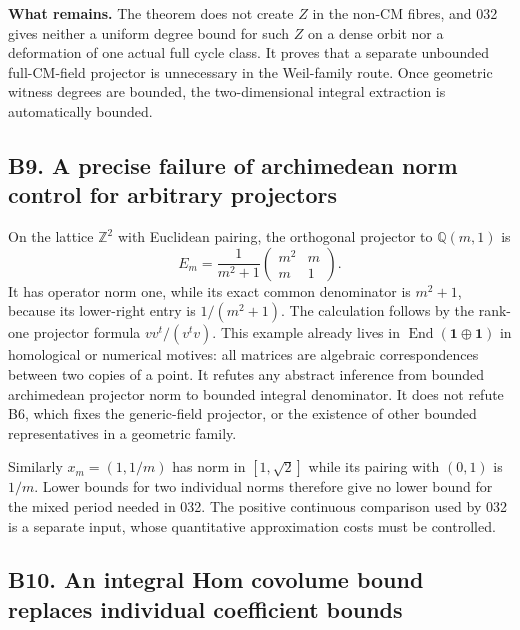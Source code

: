 \documentclass[11pt,a4paper]{article}
\theoremstyle{definition}
\begin{document}
\textbf{What remains.} The theorem does not create \(Z\) in the non-CM fibres, and 032 gives neither a uniform degree bound for such \(Z\) on a dense orbit nor a deformation of one actual full cycle class. It proves that a separate unbounded full-CM-field projector is unnecessary in the Weil-family route. Once geometric witness degrees are bounded, the two-dimensional integral extraction is automatically bounded.

\subsection{B9. A precise failure of archimedean norm control for arbitrary projectors}\label{b9.-a-precise-failure-of-archimedean-norm-control-for-arbitrary-projectors}

On the lattice \(\mathbb Z^2\) with Euclidean pairing, the orthogonal projector to \(\mathbb Q(m,1)\) is \[
 E_m=\frac1{m^2+1}\begin{pmatrix}m^2&m\\m&1\end{pmatrix}.
\] It has operator norm one, while its exact common denominator is \(m^2+1\), because its lower-right entry is \(1/(m^2+1)\). The calculation follows by the rank-one projector formula \(vv^t/(v^tv)\). This example already lives in \(\operatorname{End}(\mathbf1\oplus\mathbf1)\) in homological or numerical motives: all matrices are algebraic correspondences between two copies of a point. It refutes any abstract inference from bounded archimedean projector norm to bounded integral denominator. It does not refute B6, which fixes the generic-field projector, or the existence of other bounded representatives in a geometric family.

Similarly \(x_m=(1,1/m)\) has norm in \([1,\sqrt2]\) while its pairing with \((0,1)\) is \(1/m\). Lower bounds for two individual norms therefore give no lower bound for the mixed period needed in 032. The positive continuous comparison used by 032 is a separate input, whose quantitative approximation costs must be controlled.

\subsection{B10. An integral Hom covolume bound replaces individual coefficient bounds}\label{b10.-an-integral-hom-covolume-bound-replaces-individual-coefficient-bounds}
\end{document}

